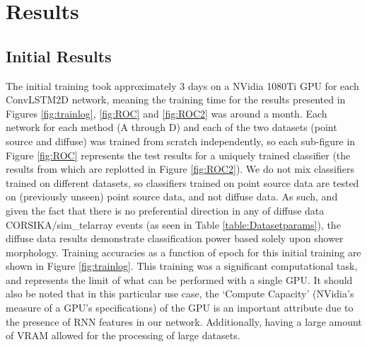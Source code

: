 \section{Results} \label{Results}
\subsection{Initial Results}
 The initial training took approximately 3 days on a NVidia 1080Ti GPU for each ConvLSTM2D network, meaning the training time for the results presented in Figures \ref{fig:trainlog}, \ref{fig:ROC} and \ref{fig:ROC2} was around a month. Each network for each method (A through D) and each of the two datasets (point source and diffuse) was trained from scratch independently, so each sub-figure in Figure \ref{fig:ROC} represents the test results for a uniquely trained classifier (the results from which are re\-plotted in Figure \ref{fig:ROC2}). We do not mix classifiers trained on different datasets, so classifiers trained on point source data are tested on (previously unseen) point source data, and not diffuse data. As such, and given the fact that there is no preferential direction in any of diffuse data CORSIKA/sim\_telarray events (as seen in Table \ref{table:Datasetparams}), the diffuse data results demonstrate classification power based solely upon shower morphology. Training accuracies as a function of epoch for this initial training are shown in Figure \ref{fig:trainlog}. This training was a significant computational task, and represents the limit of what can be performed with a single GPU. It should also be noted that in this particular use case, the `Compute Capacity' (NVidia's measure of a GPU's specifications) of the GPU is an important attribute due to the presence of RNN features in our network. Additionally, having a large amount of VRAM allowed for the processing of large datasets.
 
